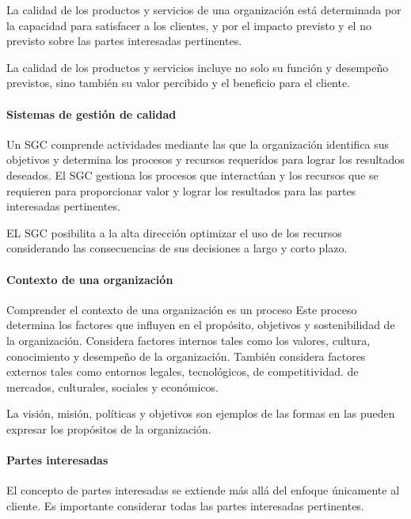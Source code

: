 		\par \noindent 
			La calidad de los productos y servicios de una organización está determinada por la capacidad para
			satisfacer a los clientes, y por el impacto previsto y el no previsto sobre las partes interesadas
			pertinentes.
			
		\par \noindent 
			La calidad de los productos y servicios incluye no solo su función y desempeño previstos, sino también su valor percibido y el beneficio para el cliente.
		
		\paragraph{Sistemas de gestión de calidad}
			Un SGC comprende actividades mediante las que la organización identifica sus objetivos y determina los
			procesos y recursos requeridos para lograr los resultados deseados.
			El SGC gestiona los procesos que interactúan y los recursos que se requieren para proporcionar valor y
			lograr los resultados para las partes interesadas pertinentes.
			
		\par \noindent 
			EL SGC posibilita a la alta dirección optimizar el uso de los recursos considerando las consecuencias de sus decisiones a largo y corto plazo.
			
		\newpage
		\thispagestyle{plain}
			
		\paragraph{Contexto de una organización}
			Comprender el contexto de una organización es un proceso Este proceso determina los factores que
			influyen en el propósito, objetivos y sostenibilidad de la organización. Considera factores internos tales
			como los valores, cultura, conocimiento y desempeño de la organización. También considera factores
			externos tales como entornos legales, tecnológicos, de competitividad. de mercados, culturales, sociales
			y económicos.
			
			
		
		\par \noindent 
			La visión, misión, políticas y objetivos son ejemplos de las formas en las pueden expresar los propósitos
			de la organización.
			
		\paragraph{Partes interesadas}
			El concepto de partes interesadas se extiende más allá del enfoque únicamente al cliente. Es importante
			considerar todas las partes interesadas pertinentes.
			
